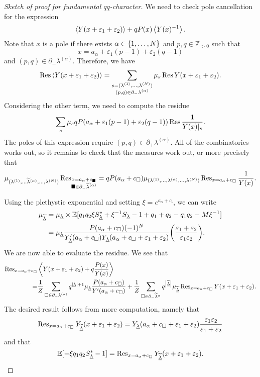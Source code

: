 \documentclass[leqno, openany]{memoir}
\theoremstyle{definition}
\theoremstyle{remark}
\theoremstyle{plain}
\theoremstyle{definition}
\theoremstyle{remark}
\newcommand{\E}{\mathbb{E}}
\newcommand{\Z}{\mathbb{Z}}
\newcommand{\ep}{\varepsilon}
\newcommand{\ul}[1]{\underline{#1}}
\newcommand{\wt}[1]{\widetilde{#1}}
\begin{document}
\begin{proof}[Sketch of proof for fundamental $qq$-character]
    We need to check pole cancellation for the expression
    \[ \ev{Y(x+\ep_1+\ep_2)} + q P(x) \ev{Y(x)^{-1}}. \]
    Note that $x$ is a pole if there exists $\alpha \in \qty{1, \ldots, N}$ and $p, q \in \Z_{>0}$ such that
    \[ x = a_{\alpha} + \ep_1(p-1) + \ep_2(q-1) \]
    and $(p,q) \in \partial_- \lambda^{(\alpha)}$. Therefore, we have
    \[ \Res \ev{Y(x + \ep_1 + \ep_2)} = \sum_{\substack{ s = (\lambda^{(1)}, \ldots, \lambda^{(N)}) \\ (p,q) \in \partial_- \lambda^{(\alpha)} }} \mu_s \Res Y(x+\ep_1+\ep_2). \]
    Considering the other term, we need to compute the residue
    \[ \sum_s \mu_s q P(a_{\alpha} + \ep_1(p-1) + \ep_2(q-1)) \Res \frac{1}{Y(x)|_s}. \]
    The poles of this expression require $(p,q) \in \partial_+ \lambda^{(\alpha)}$. All of the combinatorics works out, so it remains to check that the measures work out, or more precisely that
    \[ \mu_{(\lambda^{(1)}, \ldots \wt{\lambda}^{(\alpha)}, \ldots, \lambda^{(N)})} \Res_{\substack{x=a_{\alpha} + c_{\blacksquare} \\ \blacksquare \in \partial_- \wt{\lambda}^{(\alpha)}}} = q P(a_{\alpha} + c_{\square}) \mu_{(\lambda^{(1)}, \ldots, \lambda^{(\alpha)}, \ldots, \lambda^{(N)})} \Res_{x = a_{\alpha} + c_{\square}} \frac{1}{Y(x)}. \]

    Using the plethystic exponential and setting $\xi = e^{a_{\alpha} + c_{\square}}$, we can write
    \begin{align*}
        \mu_{\wt{\ul{\lambda}}} &= \mu_{\ul{\lambda}} \times \E[q_1 q_2 \xi S_{\ul{\lambda}}^* + \xi^{-1}S_{\ul{\lambda}} - 1 + q_1 + q_2 - q_1 q_2 - M \xi^{-1}] \\
        &= \mu_{\ul{\lambda}} \frac{P(a_{\alpha} + c_{\square}) (-1)^N}{Y'_{\ul{\lambda}}(a_{\alpha} + c_{\square}) Y_{\ul{\lambda}}(a_{\alpha} + c_{\square} + \ep_1 + \ep_2)} \qty(\frac{\ep_1 + \ep_2}{\ep_1 \ep_2}).
    \end{align*}
    We are now able to evaluate the residue. We see that
    \begin{align*}
        \Res_{x = a_{\alpha}+ c_{\square}} & \ev{Y(x+\ep_1 + \ep_2) + q \frac{P(x)}{Y(x)}} \\ 
        =&{} \frac{1}{Z} \sum_{\square \in \partial_+ \lambda^{(\alpha)}} q^{\abs{\ul{\lambda}}+1} \mu_{\ul{\lambda}} \frac{P(a_{\alpha} + c_{\square})}{Y'(a_{\alpha} + c_{\square})} + \frac{1}{Z} \sum_{\square \in \partial_- \wt{\lambda}^{\alpha}} q^{\abs{\wt{\ul{\lambda}}}} \mu_{\wt{\ul{\lambda}}} \Res_{x = a_{\alpha} + c_{\square}} Y(x + \ep_1 + \ep_2).
    \end{align*}
    The desired result follows from more computation, namely that
    \[ \Res_{x = a_{\alpha} + c_{\square}} Y_{\wt{\ul{\lambda}}} (x+\ep_1 + \ep_2) = Y_{\ul{\lambda}}(a_{\alpha} + c_{\square} + \ep_1 + \ep_2) \frac{\ep_1 \ep_2}{\ep_1 +\ep_2} \]
    and that
    \[ \E[- \xi q_1 q_2 S_{\ul{\lambda}}^* - 1] = \Res_{x = a_{\alpha} + c_{\square}} Y_{\wt{\ul{\lambda}}}(x+\ep_1+\ep_2). \qedhere \]
\end{proof}
\end{document}
